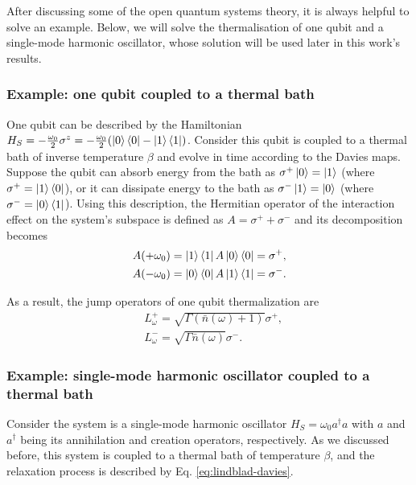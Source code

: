 After discussing some of the open quantum systems theory, it is always helpful to solve an example. Below, we will solve the thermalisation of one qubit and a single-mode harmonic oscillator, whose solution will be used later in this work's results.



\subsubsection{Example: one qubit coupled to a thermal bath}\label{sec:example-qubit}

One qubit can be described by the Hamiltonian ${H}_S = - \frac{\omega_0}{2} {\sigma}^z = - \frac{\omega_0}{2} (\ket{0}\bra{0} - \ket{1}\bra{1})$. Consider this qubit is coupled to a thermal bath of inverse temperature $\beta$ and evolve in time according to the Davies maps. Suppose the qubit can absorb energy from the bath as ${\sigma}^+ \ket{0} = \ket{1}$ (where ${\sigma}^+ = \ket{1}\bra{0}$), or it can dissipate energy to the bath as ${\sigma}^- \ket{1} = \ket{0}$ (where ${\sigma}^- = \ket{0}\bra{1}$). Using this description, the Hermitian operator of the interaction effect on the system's subspace is defined as ${A} = {\sigma}^+ + {\sigma}^-$ and its decomposition becomes
\begin{align}
    &{A}(+\omega_0) = \ket{1}\bra{1} {A} \ket{0}\bra{0} = {\sigma}^+,\\
    &{A}(-\omega_0) = \ket{0}\bra{0} {A} \ket{1}\bra{1} = {\sigma}^-.
\end{align}

\noindent As a result, the jump operators of one qubit thermalization are
\begin{align}
    &L_\omega^{+} = \sqrt{\Gamma (\bar{n}(\omega)+1)} {\sigma}^+,\\
    &L_\omega^{-} = \sqrt{\Gamma \bar{n}(\omega)} {\sigma}^-.
\end{align}



\subsubsection{Example: single-mode harmonic oscillator coupled to a thermal bath}\label{sec:example-oscillator}

Consider the system is a single-mode harmonic oscillator ${H}_S = \omega_0 {a}^\dagger {a}$ with ${a}$ and ${a}^\dagger$ being its annihilation and creation operators, respectively. As we discussed before, this system is coupled to a thermal bath of temperature $\beta$, and the relaxation process is described by Eq. \eqref{eq:lindblad-davies}.

